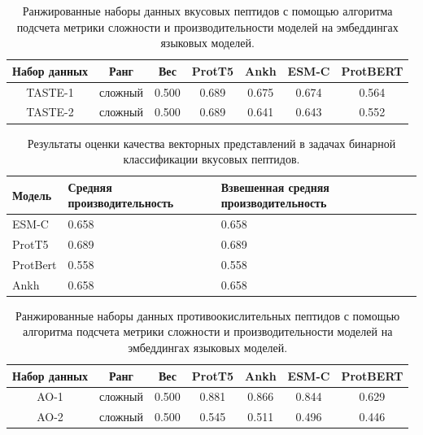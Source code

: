 \documentclass[specification,annotation,times]{itmo-student-thesis}
\begin{document}
\begin{table}[h]
\centering
\caption{Ранжированные наборы данных вкусовых пептидов с помощью алгоритма подсчета метрики сложности и производительности моделей на эмбеддингах языковых моделей.}
\label{tab:model_performance_taste}

\begin{tabular}{|c|c|c|c|c|c|c|}
\hline
Набор данных & Ранг & Вес & ProtT5 & Ankh & ESM-C & ProtBERT \\
\hline
TASTE-1 & сложный & 0.500 & 0.689 & 0.675 & 0.674 & 0.564 \\ \hline
TASTE-2 & сложный & 0.500 & 0.689 & 0.641 & 0.643 & 0.552 \\ \hline

\end{tabular}

\end{table}


\begin{table}[h]
\centering

\caption{Результаты оценки качества векторных представлений в задачах бинарной классификации вкусовых пептидов.}
\label{tab:compare_results_taste}
\begin{tabular}{|p{3cm}|p{5cm}|p{5cm}|}
\hline
Модель & Средняя \newline производительность & Взвешенная \newline средняя \newline производительность \\
\hline
ESM-C & 0.658 & 0.658 \\ \hline
ProtT5 & 0.689 & 0.689 \\ \hline
ProtBert & 0.558 & 0.558 \\ \hline
Ankh & 0.658 & 0.658 \\ \hline

\end{tabular}

\end{table}

\begin{table}[h]
\centering
\caption{Ранжированные наборы данных противоокислительных пептидов с помощью алгоритма подсчета метрики сложности и производительности моделей на эмбеддингах языковых моделей.}
\label{tab:model_performance_ao}

\begin{tabular}{|c|c|c|c|c|c|c|}
\hline
Набор данных & Ранг & Вес & ProtT5 & Ankh & ESM-C & ProtBERT \\
\hline
AO-1 & сложный & 0.500 & 0.881 & 0.866 & 0.844 & 0.629 \\ \hline
AO-2 & сложный & 0.500 & 0.545 & 0.511 & 0.496 & 0.446 \\ \hline

\end{tabular}

\end{table}
\end{document}
